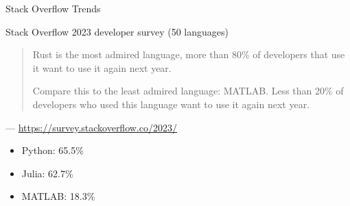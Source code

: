 \documentclass[
    xcolor={svgnames,dvipsnames},
    hyperref={colorlinks, citecolor=DeepPink4, linkcolor=DarkRed, urlcolor=DarkBlue}
    ]{beamer}  %
\newcommand{\1}{\mathbbm 1}
\begin{document}
\begin{frame}

    Stack Overflow Trends

    \begin{figure}
       \begin{center}
       \end{center}
    \end{figure}

\end{frame}


\begin{frame}

    Stack Overflow 2023 developer survey (50 languages)

    \vspace{0.5em}
    \vspace{0.5em}
    \vspace{0.5em}
    
    \begin{quote}
        Rust is the most admired language, more than 80\% of developers that use it
        want to use it again next year.

        \vspace{0.5em}
        \vspace{0.5em}
        Compare this to the least admired language:
        MATLAB. Less than 20\% of developers who used this language want to use it again next year.
    \end{quote}

    \hspace*{\fill}--- \url{https://survey.stackoverflow.co/2023/}

        \vspace{0.5em}
        \vspace{0.5em}

    \begin{itemize}
        \item Python: 65.5\%
        \item Julia: 62.7\%
        \item MATLAB: 18.3\%
    \end{itemize}

\end{frame}
\end{document}
